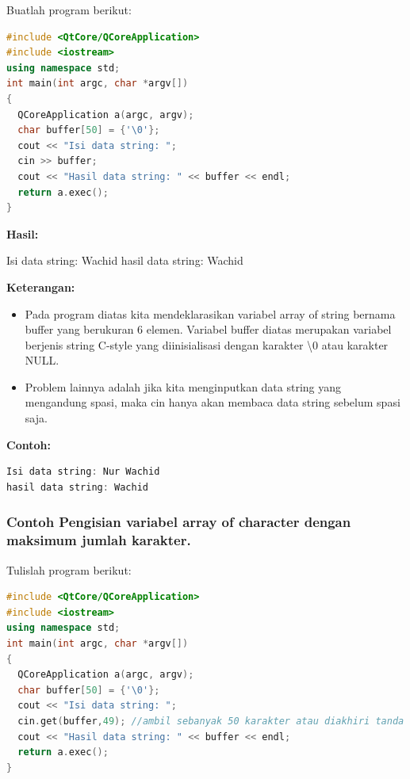 Buatlah program berikut:

\begin{lstlisting}[language=c++, caption=Mengisi Array of Character, label=contoh3-16]
#include <QtCore/QCoreApplication>
#include <iostream>
using namespace std;
int main(int argc, char *argv[])
{
  QCoreApplication a(argc, argv);
  char buffer[50] = {'\0'};
  cout << "Isi data string: ";
  cin >> buffer;
  cout << "Hasil data string: " << buffer << endl;
  return a.exec();
}
\end{lstlisting}

\textbf{Hasil:}
\begin{lcverbatim}
Isi data string: Wachid
hasil data string: Wachid
\end{lcverbatim}


\textbf{Keterangan:}

\begin{itemize}

\item
  Pada program diatas kita mendeklarasikan variabel array of string
  bernama buffer yang berukuran 6 elemen. Variabel buffer diatas
  merupakan variabel berjenis string C-style yang diinisialisasi dengan
  karakter \textbackslash{0} atau karakter NULL.
\item
  Problem lainnya adalah jika kita menginputkan data string yang
  mengandung spasi, maka cin hanya akan membaca data string sebelum
  spasi saja.
\end{itemize}

\textbf{Contoh:}

\begin{lstlisting}[language=c++, numbers=none]
Isi data string: Nur Wachid
hasil data string: Wachid
\end{lstlisting}

\subsubsection*{Contoh  Pengisian variabel array of character dengan maksimum jumlah
karakter.}

Tulislah program berikut:

\begin{lstlisting}[language=c++, caption=Pengisian variabel array of character dengan maksimum jumlah
karakter, label=contoh3-17]
#include <QtCore/QCoreApplication>
#include <iostream>
using namespace std;
int main(int argc, char *argv[])
{
  QCoreApplication a(argc, argv);
  char buffer[50] = {'\0'};
  cout << "Isi data string: ";
  cin.get(buffer,49); //ambil sebanyak 50 karakter atau diakhiri tanda enter
  cout << "Hasil data string: " << buffer << endl;
  return a.exec();
}
\end{lstlisting}

